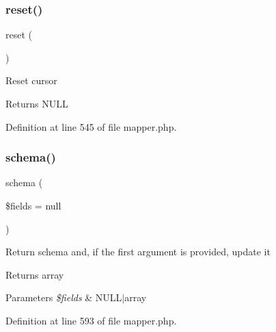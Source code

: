 \hypertarget{class_d_b_1_1_s_q_l_1_1_mapper_a4a20559544fdf4dcb457e258dc976cf8}{}\label{class_d_b_1_1_s_q_l_1_1_mapper_a4a20559544fdf4dcb457e258dc976cf8} 
\subsubsection{\texorpdfstring{reset()}{reset()}}
{\footnotesize\ttfamily reset (\begin{DoxyParamCaption}{ }\end{DoxyParamCaption})}

Reset cursor \begin{DoxyReturn}{Returns}
N\+U\+LL 
\end{DoxyReturn}


Definition at line 545 of file mapper.\+php.

\hypertarget{class_d_b_1_1_s_q_l_1_1_mapper_a559eb01be1295928258bd765e1221142}{}\label{class_d_b_1_1_s_q_l_1_1_mapper_a559eb01be1295928258bd765e1221142} 
\subsubsection{\texorpdfstring{schema()}{schema()}}
{\footnotesize\ttfamily schema (\begin{DoxyParamCaption}\item[{}]{\$fields = {\ttfamily null} }\end{DoxyParamCaption})}

Return schema and, if the first argument is provided, update it \begin{DoxyReturn}{Returns}
array 
\end{DoxyReturn}

\begin{DoxyParams}{Parameters}
{\em \$fields} & N\+U\+L\+L$\vert$array \\
\hline
\end{DoxyParams}


Definition at line 593 of file mapper.\+php.

\hypertarget{class_d_b_1_1_s_q_l_1_1_mapper_a30a0cf51ad0e9b95ced09845cd15d385}{}\label{class_d_b_1_1_s_q_l_1_1_mapper_a30a0cf51ad0e9b95ced09845cd15d385} 
